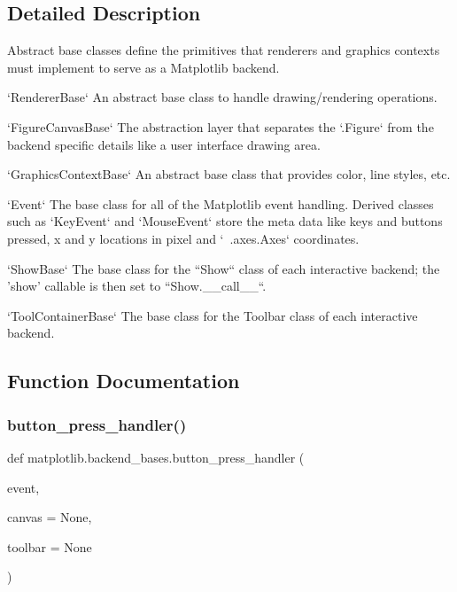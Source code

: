 \subsection{Detailed Description}
\begin{DoxyVerb}Abstract base classes define the primitives that renderers and
graphics contexts must implement to serve as a Matplotlib backend.

`RendererBase`
    An abstract base class to handle drawing/rendering operations.

`FigureCanvasBase`
    The abstraction layer that separates the `.Figure` from the backend
    specific details like a user interface drawing area.

`GraphicsContextBase`
    An abstract base class that provides color, line styles, etc.

`Event`
    The base class for all of the Matplotlib event handling.  Derived classes
    such as `KeyEvent` and `MouseEvent` store the meta data like keys and
    buttons pressed, x and y locations in pixel and `~.axes.Axes` coordinates.

`ShowBase`
    The base class for the ``Show`` class of each interactive backend; the
    'show' callable is then set to ``Show.__call__``.

`ToolContainerBase`
    The base class for the Toolbar class of each interactive backend.
\end{DoxyVerb}
 

\subsection{Function Documentation}
\mbox{\label{namespacematplotlib_1_1backend__bases_a1eb12e49461e6fd3c786ee9817a0838e}} 
\subsubsection{\texorpdfstring{button\+\_\+press\+\_\+handler()}{button\_press\_handler()}}
{\footnotesize\ttfamily def matplotlib.\+backend\+\_\+bases.\+button\+\_\+press\+\_\+handler (\begin{DoxyParamCaption}\item[{}]{event,  }\item[{}]{canvas = {\ttfamily None},  }\item[{}]{toolbar = {\ttfamily None} }\end{DoxyParamCaption})}

